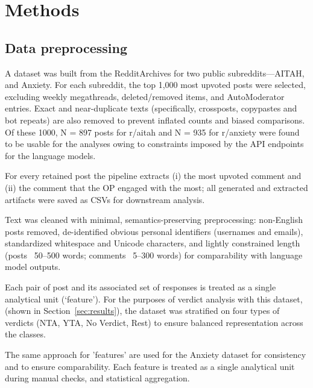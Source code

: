 \chapter{Methods} \label{sec:Methods}

\section{Data preprocessing}
A dataset was built from the RedditArchives for two public subreddits—AITAH, and Anxiety. For each subreddit, the top 1,000 most upvoted posts were selected, excluding weekly megathreads, deleted/removed items, and AutoModerator entries. Exact and near-duplicate texts (specifically, crossposts, copypastes and bot repeats) are also removed to prevent inflated counts and biased comparisons. Of these 1000, N = 897 posts for r/aitah and N = 935 for r/anxiety were found to be usable for the analyses owing to constraints imposed by the API endpoints for the language models.

For every retained post the pipeline extracts (i) the most upvoted comment and (ii) the comment that the OP engaged with the most; all generated and extracted artifacts were saved as CSVs for downstream analysis.

Text was cleaned with minimal, semantics-preserving preprocessing: non-English posts removed, de-identified obvious personal identifiers (usernames and emails), standardized whitespace and Unicode characters, and lightly constrained length (posts ~50–500 words; comments ~5–300 words) for comparability with language model outputs.

Each pair of post and its associated set of responses is treated as a single analytical unit (‘feature’). For the purposes of verdict analysis with this dataset, (shown in Section~\ref{sec:results}), the dataset was stratified on four types of verdicts (NTA, YTA, No Verdict, Rest) to ensure balanced representation across the classes.

The same approach for 'features' are used for the Anxiety dataset for consistency and to ensure comparability. Each feature is treated as a single analytical unit during manual checks, and statistical aggregation.

